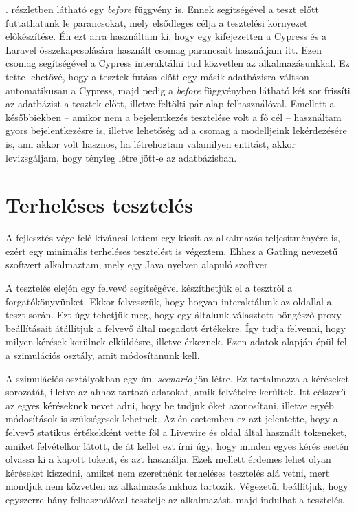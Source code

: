 \documentclass[
]{thesis-ekf}
\theoremstyle{definition}
\theoremstyle{remark}
\begin{document}
. részletben látható egy \emph{before} függvény is. Ennek segítségével a teszt előtt futtathatunk le parancsokat, mely elsődleges célja a tesztelési környezet előkészítése. Én ezt arra használtam ki, hogy egy kifejezetten a Cypress és a Laravel összekapcsolására használt csomag\cite{laravelCypress} parancsait használjam itt. Ezen csomag segítségével a Cypress interaktálni tud közvetlen az alkalmazásunkkal. Ez tette lehetővé, hogy a tesztek futása előtt egy másik adatbázisra váltson automatikusan a Cypress, majd pedig a \emph{before} függvényben látható két sor frissíti az adatbázist a tesztek előtt, illetve feltölti pár alap felhasználóval. Emellett a későbbiekben -- amikor nem a bejelentkezés tesztelése volt a fő cél -- használtam gyors bejelentkezésre is, illetve lehetőség ad a csomag a modelljeink lekérdezésére is, ami akkor volt hasznos, ha létrehoztam valamilyen entitást, akkor levizsgáljam, hogy tényleg létre jött-e az adatbázisban.

\section{Terheléses tesztelés}

A fejlesztés vége felé kíváncsi lettem egy kicsit az alkalmazás teljesítményére is, ezért egy minimális terheléses tesztelést is végeztem. Ehhez a Gatling\cite{gatling} nevezetű szoftvert alkalmaztam, mely egy Java nyelven alapuló szoftver.

A tesztelés elején egy felvevő segítségével készíthetjük el a tesztről a forgatókönyvünket. Ekkor felvesszük, hogy hogyan interaktálunk az oldallal a teszt során. Ezt úgy tehetjük meg, hogy egy általunk választott böngésző proxy beállításait átállítjuk a felvevő által megadott értékekre. Így tudja felvenni, hogy milyen kérések kerülnek elküldésre, illetve érkeznek. Ezen adatok alapján épül fel a szimulációs osztály, amit módosítanunk kell.\cite{gatlingRecorder}

A szimulációs osztályokban egy ún. \emph{scenario} jön létre. Ez tartalmazza a kéréseket sorozatát, illetve az ahhoz tartozó adatokat, amik felvételre kerültek. Itt célszerű az egyes kéréseknek nevet adni, hogy be tudjuk őket azonosítani, illetve egyéb módosítások is szükségesek lehetnek. Az én esetemben ez azt jelentette, hogy a felvevő statikus értékekként vette föl a Livewire és oldal által használt tokeneket, amiket felvételkor látott, de át kellet ezt írni úgy, hogy minden egyes kérés esetén olvassa ki a kapott tokent, és azt használja. Ezek mellett érdemes lehet olyan kéréseket kiszedni, amiket nem szeretnénk terheléses tesztelés alá vetni, mert mondjuk nem közvetlen az alkalmazásunkhoz tartozik. Végezetül beállítjuk, hogy egyszerre hány felhasználóval tesztelje az alkalmazást, majd indulhat a tesztelés.\cite{gatlingScenario}
\end{document}

